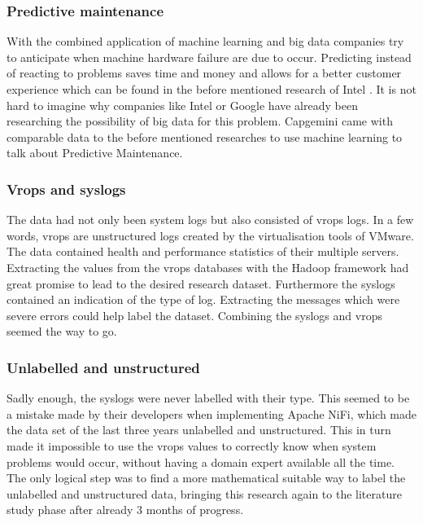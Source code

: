 \subsubsection{Predictive maintenance}
With the combined application of machine learning and big data companies try to anticipate when machine hardware failure are due to occur. Predicting instead of reacting to problems saves time and money and allows for a better customer experience which can be found in the before mentioned research of Intel \cite{Sipos2014Log-basedMaintenance}\cite{AjayChandramoulyRavindraNarkhedeVijayMungaraGuillermoRueda2013ReducingAnalytics}. It is not hard to imagine why companies like Intel  or Google have already been researching the possibility of big data for this problem. Capgemini came with comparable data to the before mentioned researches to use machine learning to talk about Predictive Maintenance.

\subsubsection{Vrops and syslogs}
The data had not only been system logs but also consisted of vrops logs. In a few words, vrops are unstructured logs created by the virtualisation tools of VMware. The data contained health and performance statistics of their multiple servers. Extracting the values from the vrops databases with the Hadoop framework had great promise to lead to the desired research dataset. Furthermore the syslogs contained an indication of the type of log. Extracting the messages which were severe errors could help label the dataset. Combining the syslogs and vrops seemed the way to go. 

\subsubsection{Unlabelled and unstructured}
Sadly enough, the syslogs were never labelled with their type. This seemed to be a mistake made by their developers when implementing Apache NiFi, which made the data set of the last three years unlabelled and unstructured. This in turn made it impossible to use the vrops values to correctly know when system problems would occur, without having a domain expert available all the time. The only logical step was to find a more mathematical suitable way to label the unlabelled and unstructured data, bringing this research again to the literature study phase after already 3 months of progress.


